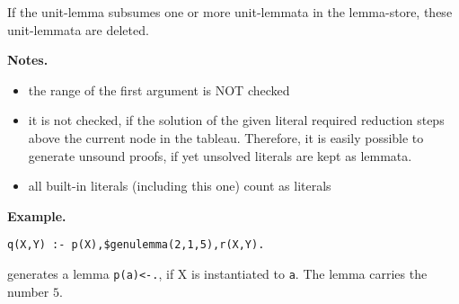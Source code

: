 If the unit-lemma subsumes one or more unit-lemmata in the lemma-store,
these unit-lemmata are deleted.

 
 
\vspace*{0.5cm}
\noindent
{\bf Notes.}
\begin{itemize}
\item
the range of the first argument is NOT checked
\item
it is not checked, if the solution of the given literal required
reduction steps above the current node in the tableau.
Therefore, it is easily possible to generate unsound proofs, if
yet unsolved literals are kept as lemmata.
\item
all built-in literals (including this one) count as literals
\end{itemize}

\vspace*{0.5cm}
\noindent
{\bf Example.}
\begin{verbatim}
q(X,Y) :- p(X),$genulemma(2,1,5),r(X,Y).
\end{verbatim}
 
generates a lemma {\tt p(a)<-.}, if X is instantiated to {\tt a}.
The lemma carries the number $5$.
 


